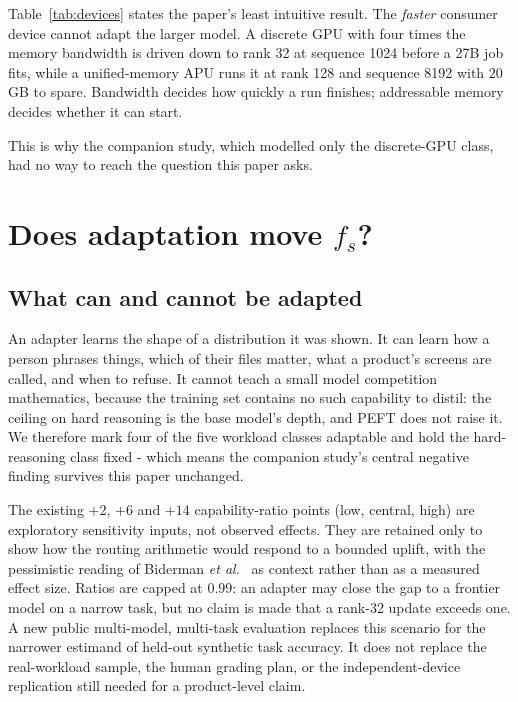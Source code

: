 \documentclass[conference]{IEEEtran}
\newcommand{\fs}{f_{s}}
\begin{document}
Table~\ref{tab:devices} states the paper's least intuitive result. The
\emph{faster} consumer device cannot adapt the larger model. A discrete GPU with
four times the memory bandwidth is driven down to rank 32 at sequence 1024
before a 27B job fits, while a unified-memory APU runs it at rank 128 and
sequence 8192 with $20$\,GB to spare. Bandwidth decides how quickly a run
finishes; addressable memory decides whether it can start.

This is why the companion study, which modelled only the discrete-GPU class,
had no way to reach the question this paper asks.

\section{Does adaptation move \texorpdfstring{$\fs$}{f\_s}?}
\label{sec:uplift}

\subsection{What can and cannot be adapted}

An adapter learns the shape of a distribution it was shown. It can learn how a
person phrases things, which of their files matter, what a product's screens are
called, and when to refuse. It cannot teach a small model competition
mathematics, because the training set contains no such capability to distil: the
ceiling on hard reasoning is the base model's depth, and PEFT does not raise it.
We therefore mark four of the five workload classes adaptable and hold
the hard-reasoning class fixed - which means the companion study's central negative
finding survives this paper unchanged.

The existing $+2$, $+6$ and $+14$ capability-ratio points (low, central, high)
are exploratory sensitivity inputs, not observed effects. They are retained
only to show how the routing arithmetic would respond to a bounded uplift, with
the pessimistic reading of Biderman \emph{et al.}~\cite{biderman2024lora} as
context rather than as a measured effect size. Ratios are capped at $0.99$: an
adapter may close the gap to a frontier model on a narrow task, but no claim is
made that a rank-32 update exceeds one. A new public multi-model, multi-task
evaluation replaces this scenario for the narrower estimand of held-out
synthetic task accuracy. It does not replace the real-workload sample, the
human grading plan, or the independent-device replication still needed for a
product-level claim.
\end{document}
